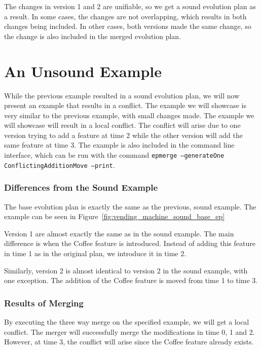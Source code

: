 \documentclass[a4paper,english]{ifimaster}
\begin{document}
The changes in version 1 and 2 are unifiable, so we get a sound evolution plan as a result. In some cases, the changes are not overlapping, which results in both changes being included. In other cases, both versions made the same change, so the change is also included in the merged evolution plan.

\section{An Unsound Example}%
\label{sec:an_unsound_example}

While the previous example resulted in a sound evolution plan, we will now present an example that results in a conflict. The example we will showcase is very similar to the previous example, with small changes made. The example we will showcase will result in a local conflict. The conflict will arise due to one version trying to add a feature at time 2 while the other version will add the same feature at time 3. The example is also included in the command line interface, which can be run with the command \texttt{epmerge --generateOne ConflictingAdditionMove --print}.

\subsubsection{Differences from the Sound Example}%

The base evolution plan is exactly the same as the previous, sound example. The example can be seen in Figure~\vref{fig:vending_machine_sound_base_ep}

Version 1 are almost exactly the same as in the sound example. The main difference is when the Coffee feature is introduced. Instead of adding this feature in time 1 as in the original plan, we introduce it in time 2.

Similarly, version 2 is almost identical to version 2 in the sound example, with one exception. The addition of the Coffee feature is moved from time 1 to time 3.

\subsubsection{Results of Merging}%
\label{ssub:results_of_merging}

By executing the three way merge on the specified example, we will get a local conflict. The merger will successfully merge the modifications in time 0, 1 and 2. However, at time 3, the conflict will arise since the Coffee feature already exists.
\end{document}
